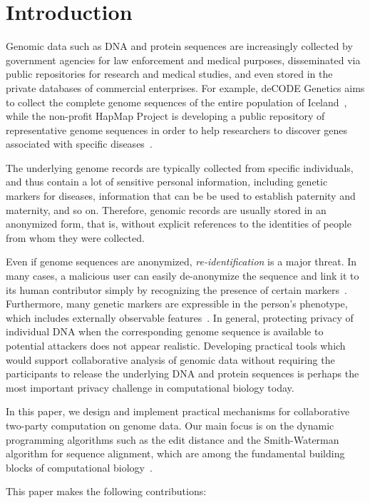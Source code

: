 \section{Introduction}

Genomic data such as DNA and protein sequences are increasingly collected
by government agencies for law enforcement and medical purposes,
disseminated via public repositories for research and medical studies,
and even stored in the private databases of commercial enterprises.
For example, deCODE Genetics aims to collect the complete genome sequences
of the entire population of Iceland~\cite{decode}, while the non-profit
HapMap Project is developing a public repository of representative genome
sequences in order to help researchers to discover genes associated with
specific diseases~\cite{hapmap}.

The underlying genome records are typically collected from specific
individuals, and thus contain a lot of sensitive personal information,
including genetic markers for diseases, information that can be be used to
establish paternity and maternity, and so on.  Therefore, genomic records
are usually stored in an anonymized form, that is, without explicit
references to the identities of people from whom they were collected.

Even if genome sequences are anonymized, \emph{re-identification} is a
major threat.  In many cases, a malicious user can easily de-anonymize
the sequence and link it to its human contributor simply by recognizing
the presence of certain markers~\cite{cmugenome}.  Furthermore,
many genetic markers are expressible in the person's phenotype, which
includes externally observable features~\cite{harvard}.  In general,
protecting privacy of individual DNA when the corresponding genome
sequence is available to potential attackers does not appear realistic.
Developing practical tools which would support collaborative analysis of
genomic data without requiring the participants to release the underlying
DNA and protein sequences is perhaps the most important privacy challenge
in computational biology today.

In this paper, we design and implement practical mechanisms for
collaborative two-party computation on genome data.  Our main focus is
on the dynamic programming algorithms such as the edit distance and
the Smith-Waterman algorithm for sequence alignment, which are among
the fundamental building blocks of computational biology~\cite[Chapter
11]{Gusfield}.

This paper makes the following contributions:

